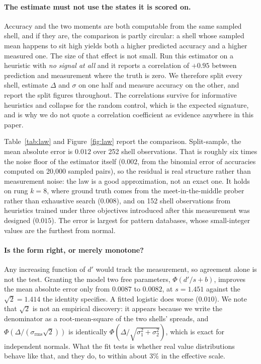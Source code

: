 \documentclass{article}
\begin{document}
\paragraph{The estimate must not use the states it is scored on.} Accuracy and
the two moments are both computable from the same sampled shell, and if they are,
the comparison is partly circular: a shell whose sampled mean happens to sit high
yields both a higher predicted accuracy and a higher measured one. The size of
that effect is not small. Run this estimator on a heuristic with \emph{no signal
at all} and it reports a correlation of $+0.95$ between prediction and
measurement where the truth is zero. We therefore split every shell, estimate
$\Delta$ and $\sigma$ on one half and measure accuracy on the other, and report
the split figures throughout. The correlations survive for informative
heuristics and collapse for the random control, which is the expected signature,
and is why we do not quote a correlation coefficient as evidence anywhere in
this paper.

Table~\ref{tab:law} and Figure~\ref{fig:law} report the comparison. Split-sample,
the mean absolute error is $0.012$ over 252 shell observations. That is roughly
six times the noise floor of the estimator itself ($0.002$, from the binomial
error of accuracies computed on 20{,}000 sampled pairs), so the residual is real
structure rather than measurement noise: the law is a good approximation, not
an exact one. It holds on rung $k=8$, where ground truth comes from the
meet-in-the-middle prober rather than exhaustive search ($0.008$), and on 152
shell observations from heuristics trained under three objectives introduced
after this measurement was designed ($0.015$). The error is largest for pattern
databases, whose small-integer values are the furthest from normal.

\paragraph{Is the form right, or merely monotone?} Any increasing function of
$d'$ would track the measurement, so agreement alone is not the test. Granting
the model two free parameters, $\Phi(d'/s + b)$, improves the mean absolute error
only from $0.0087$ to $0.0082$, at $s = 1.451$ against the $\sqrt{2} = 1.414$ the
identity specifies. A fitted logistic does worse ($0.010$). We note that $\sqrt{2}$
is not an empirical discovery: it appears because we write the denominator as a
root-mean-square of the two shells' spreads, and
$\Phi(\Delta/(\sigma_{\mathrm{rms}}\sqrt{2}))$ is identically
$\Phi(\Delta/\sqrt{\sigma_1^2+\sigma_2^2})$, which is exact for independent
normals. What the fit tests is whether real value distributions behave like that,
and they do, to within about 3\% in the effective scale.
\end{document}
